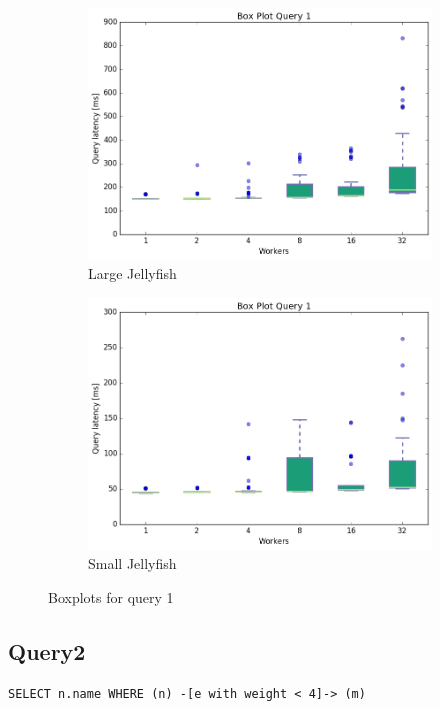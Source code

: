 \documentclass[11pt,singlecolumn]{scrartcl}
\begin{document}
\begin{figure}
\begin{subfigure}[b]{0.475\textwidth}
        \centering 
        \includegraphics[width=\textwidth]{boxesjl/q1}
        \caption[]%
        {{\small Large Jellyfish}}    
        \label{fig:mean and std of net34}
    \end{subfigure}
    \quad
    \begin{subfigure}[b]{0.475\textwidth}   
        \centering 
        \includegraphics[width=\textwidth]{boxesjs/q1}
        \caption[]%
        {{\small Small Jellyfish}}    
        \label{fig:mean and std of net44}
    \end{subfigure}
    \caption[  Boxplots for query 1 ]
    {\small Boxplots for query 1} 
    \label{fig:mean and std of nets}
\end{figure}
\clearpage
\subsection{Query2}
\begin{verbatim}
SELECT n.name WHERE (n) -[e with weight < 4]-> (m)\end{verbatim}
\end{document}
